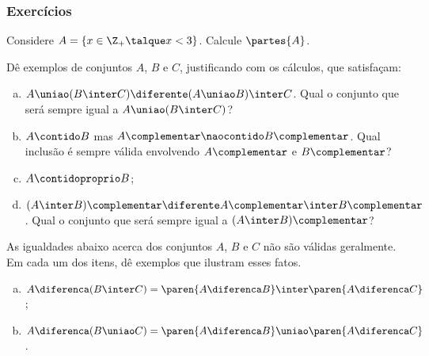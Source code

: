 \begin{frame}
	\frametitle{Exercícios}
	
	\begin{exercicio}
		Considere $A = \{x \in \Z_+ \talque x<3 \}$. Calcule $\partes{A}$.
	\end{exercicio}

	\begin{exercicio}
		Dê exemplos de conjuntos $A$, $B$ e $C$, justificando com os cálculos, que satisfaçam:
		\begin{enumerate}[a)]
			\item $A \uniao ( B \inter C) \diferente (A \uniao B) \inter C$. Qual o conjunto que será sempre igual a $A \uniao ( B \inter C)$?
			\item $A \contido B$ mas $A\complementar \naocontido B\complementar$. Qual inclusão é sempre válida envolvendo $A\complementar$ e $B\complementar$?
			\item $A \contidoproprio B$;
			\item $(A \inter B)\complementar \diferente A\complementar \inter B\complementar$. Qual o conjunto que será sempre igual a $(A \inter B)\complementar$?
		\end{enumerate}
	\end{exercicio}

	\begin{exercicio}
		As igualdades abaixo acerca dos conjuntos $A$, $B$ e $C$ não são válidas geralmente. Em cada um dos itens, dê exemplos que ilustram esses fatos.
		\begin{enumerate}[a)]
			\item $A \diferenca ( B \inter C) = \paren{A \diferenca B} \inter \paren{A \diferenca C}$;
			\item $A \diferenca ( B \uniao C) = \paren{A \diferenca B} \uniao \paren{A \diferenca C}$.
		\end{enumerate}
	\end{exercicio}
\end{frame}


